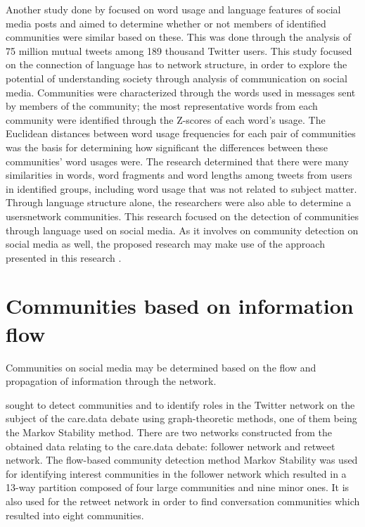 Another study done by  focused on word usage and language features of social media posts and aimed to determine whether or not members of identified communities were similar based on these. This was done through the analysis of 75 million mutual tweets among 189 thousand Twitter users. This study focused on the connection of language has to network structure, in order to explore the potential of understanding society through analysis of communication on social media. Communities were characterized through the words used in messages sent by members of the community; the most representative words from each community were identified through the Z-scores of each word’s usage. The Euclidean distances between word usage frequencies for each pair of communities was the basis for determining how significant the differences between these communities’ word usages were. The research determined that there were many similarities in words, word fragments and word lengths among tweets from users in identified groups, including word usage that was not related to subject matter. Through language structure alone, the researchers were also able to determine a users\vtick network communities. This research focused on the detection of communities through language used on social media. As it involves on community detection on social media as well, the proposed research may make use of the approach presented in this research \cite{Bryden:2013}.


\section{Communities based on information flow}


Communities on social media may be determined based on the flow and propagation of information through the network.


 sought to detect communities and to identify roles in the Twitter network on the subject of the care.data debate using graph-theoretic methods, one of them being the Markov Stability method. There are two networks constructed from the obtained data relating to the care.data debate: follower network and retweet network. The flow-based community detection method Markov Stability was used for identifying interest communities in the follower network which resulted in a 13-way partition composed of four large communities and nine minor ones. It is also used for the retweet network in order to find conversation communities which resulted into eight communities. 


